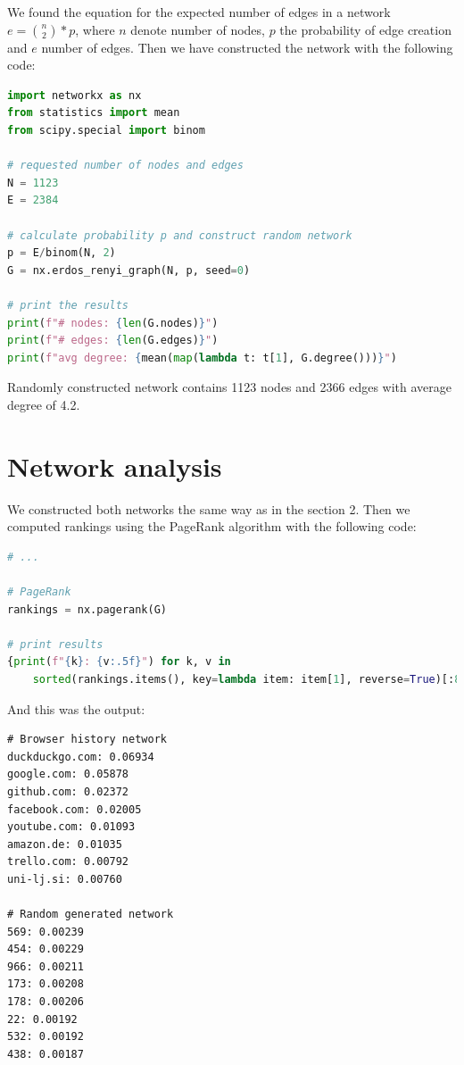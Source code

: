 \documentclass[11pt,a4paper]{article}
\begin{document}
We found the equation for the expected number of edges in a network $e = {n\choose 2}*p$, where $n$ denote number of nodes, $p$ the probability of edge creation and $e$ number of edges. Then we have constructed the network with the following code:

\begin{lstlisting}[language=Python, caption=src/part2\_random.py]
import networkx as nx
from statistics import mean 
from scipy.special import binom

# requested number of nodes and edges
N = 1123
E = 2384

# calculate probability p and construct random network
p = E/binom(N, 2)
G = nx.erdos_renyi_graph(N, p, seed=0)

# print the results
print(f"# nodes: {len(G.nodes)}")
print(f"# edges: {len(G.edges)}")
print(f"avg degree: {mean(map(lambda t: t[1], G.degree()))}")
\end{lstlisting}

Randomly constructed network contains 1123 nodes and 2366 edges with average degree of 4.2.

\pagebreak

\section{Network analysis}

We constructed both networks the same way as in the section 2. Then we computed rankings using the PageRank algorithm with the following code:

\begin{lstlisting}[language=Python, caption=src/part3.py]
# ...

# PageRank
rankings = nx.pagerank(G)

# print results
{print(f"{k}: {v:.5f}") for k, v in
    sorted(rankings.items(), key=lambda item: item[1], reverse=True)[:8]}
\end{lstlisting}

And this was the output:

\begin{lstlisting}[caption=Top rankings based on PageRank algorithm]
# Browser history network
duckduckgo.com: 0.06934
google.com: 0.05878
github.com: 0.02372
facebook.com: 0.02005
youtube.com: 0.01093
amazon.de: 0.01035
trello.com: 0.00792
uni-lj.si: 0.00760

# Random generated network
569: 0.00239
454: 0.00229
966: 0.00211
173: 0.00208
178: 0.00206
22: 0.00192
532: 0.00192
438: 0.00187
\end{lstlisting}
\end{document}
